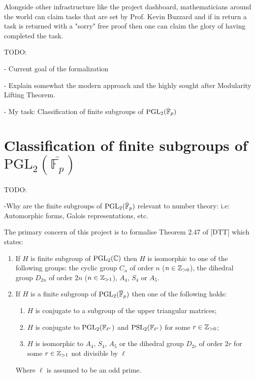 Alongside other infrastructure like the project dashboard, mathematicians around the world can claim tasks that are set by Prof. Kevin Buzzard and if in return a task is returned with a "sorry" free proof then one can claim the glory of having completed the task.

TODO:

- Current goal of the formalization

- Explain somewhat the modern approach and the highly sought after Modularity Lifting Theorem.

- My task: Classification of finite subgroups of $\textrm{PGL}_2(\bar{\mathbb{F}}_p)$



\section{Classification of finite subgroups of $\textrm{PGL}_2(\overline{\mathbb{F}_p})$}

TODO:

-Why are the finite subgroups of  $\textrm{PGL}_2(\bar{\mathbb{F}}_p)$ relevant to number theory: i.e: Automorphic forms, Galois representations, etc.


The primary concern of this project is to formalise Theorem 2.47 of [DTT] which states:

\begin{enumerate}
    \item If $H$ is finite subgroup of $\textrm{PGL}_2(\mathbb{C})$ then $H$ is isomorphic to one of the following groups: the cyclic group $C_n$ of order $n$ ($n \in \mathbb{Z}_{>0}$), the dihedral group $D_{2n}$ of order $2n$ ($n \in \mathbb{Z}_{>1}$), $A_4$, $S_4$ or $A_5$.
\item If $H$ is a finite subgroup of $\textrm{PGL}_2(\overline{\mathbb{F}}_p)$ then one of the following holds:
\begin{enumerate}
    \item $H$ is conjugate to a subgroup of the upper triangular matrices;
    \item $H$ is conjugate to $\textrm{PGL}_2(\mathbb{F}_{\ell^r})$ and $\textrm{PSL}_2(\mathbb{F}_{\ell^{r}})$ for some $r \in \mathbb{Z}_{>0}$;
    \item $H$ is isomorphic to $A_4$, $S_4$, $A_5$ or the dihedral group $D_{2r}$ of order $2r$ for some $r \in \mathbb{Z}_{>1}$ not divisible by $\ell$

\end{enumerate}
    Where $\ell$ is assumed to be an odd prime.
\end{enumerate}


